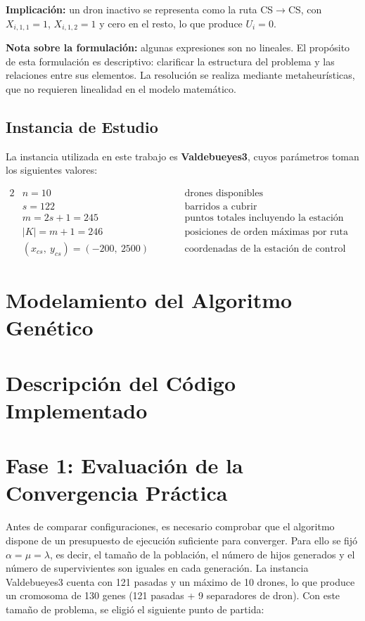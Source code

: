 \documentclass[11pt,a4paper]{article}
\begin{document}
\noindent\textbf{Implicación:} un dron inactivo se representa como la ruta CS$\rightarrow$CS, con $X_{i,1,1}=1$, $X_{i,1,2}=1$ y cero en el resto, lo que produce $U_i = 0$.

\noindent\textbf{Nota sobre la formulación:} algunas expresiones son no lineales. El propósito de esta formulación es descriptivo: clarificar la estructura del problema y las relaciones entre sus elementos. La resolución se realiza mediante metaheurísticas, que no requieren linealidad en el modelo matemático.

\subsection*{Instancia de Estudio}

La instancia utilizada en este trabajo es \textbf{Valdebueyes3}, cuyos parámetros toman los siguientes valores:

\begin{alignat}{2}
    &n = 10    \qquad && \text{drones disponibles} \\
    &s = 122 \qquad && \text{barridos a cubrir} \\
    &m = 2s + 1 = 245 \qquad && \text{puntos totales incluyendo la estación de control} \\
    &|K| = m + 1 = 246 \qquad && \text{posiciones de orden máximas por ruta} \\
    &(x_{cs},\ y_{cs}) = (-200,\ 2500) \qquad && \text{coordenadas de la estación de control}
\end{alignat}


\section{Modelamiento del Algoritmo Genético}

\section{Descripción del Código Implementado}

\section{Fase 1: Evaluación de la Convergencia Práctica}

Antes de comparar configuraciones, es necesario comprobar que el algoritmo dispone de
un presupuesto de ejecución suficiente para converger. Para ello se fijó
$\alpha = \mu = \lambda$, es decir, el tamaño de la población, el número de hijos
generados y el número de supervivientes son iguales en cada generación.
La instancia Valdebueyes3 cuenta con 121 pasadas y un máximo de 10 drones, lo que
produce un cromosoma de 130 genes (121 pasadas + 9 separadores de dron).
Con este tamaño de problema, se eligió el siguiente punto de partida:
\end{document}
